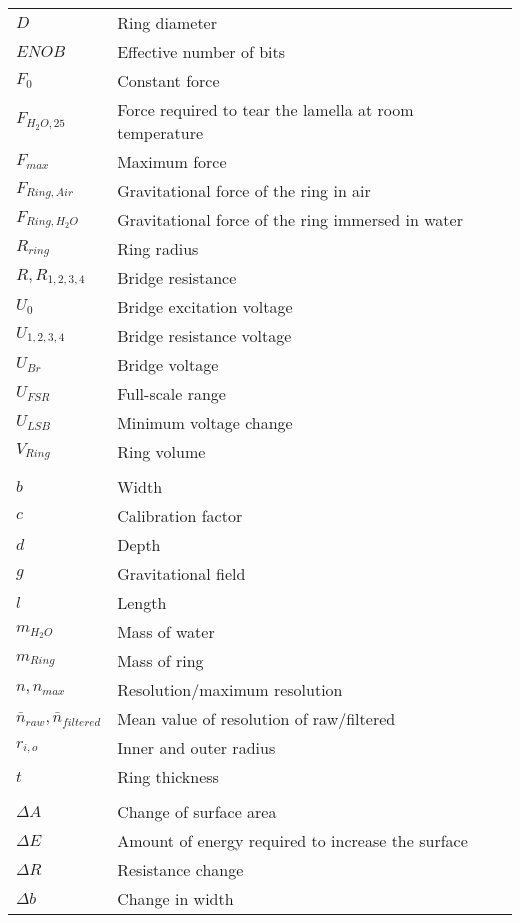 %
\begin{longtable}[l]{@{}ll@{}}
	\( D \) & Ring diameter\\
	\( ENOB \) & Effective number of bits\\
	\( F_0 \) & Constant force\\
	\( F_{H_2O,25} \) & Force required to tear the lamella at room temperature\\
	\( F_{max} \) & Maximum force\\
	\( F_{Ring,Air} \) & Gravitational force of the ring in air\\
	\( F_{Ring,H_2O} \) & Gravitational force of the ring immersed in water\\
	\( R_{ring} \) & Ring radius\\
	\( R,R_{1,2,3,4} \) & Bridge resistance\\
	\( U_0 \) & Bridge excitation voltage\\
	\( U_{1,2,3,4} \) & Bridge resistance voltage\\
	\( U_{Br} \) & Bridge voltage\\
	\( U_{FSR} \) & Full-scale range\\
	\( U_{LSB} \) & Minimum voltage change\\
	\( V_{Ring} \) & Ring volume\\
	\\
	\( b \) & Width\\
	\( c \) & Calibration factor\\
	\( d \) & Depth\\
	\( g \) & Gravitational field\\
	\( l \) & Length\\
	\( m_{H_2O} \) & Mass of water\\
	\( m_{Ring} \) & Mass of ring\\
	\( n, n_{max} \) & Resolution/maximum resolution\\
	\( \bar{n}_{raw}, \bar{n}_{filtered} \) & Mean value of resolution of raw/filtered\\
	\( r_{i,o} \) & Inner and outer radius\\
	\( t \) & Ring thickness\\
	\\
	\( \Delta A \) & Change of surface area\\
	\( \Delta E \) & Amount of energy required to increase the surface\\
	\( \Delta R \) & Resistance change\\
	\( \Delta b \) & Change in width\\

\end{longtable}
